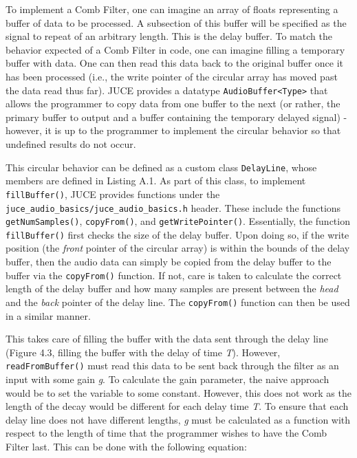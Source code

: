 To implement a Comb Filter, one can imagine an array of floats representing a buffer of data to be processed. A subsection of this buffer will be specified as the signal to repeat of an arbitrary length. This is the delay buffer. To match the behavior expected of a Comb Filter in code, one can imagine filling a temporary buffer with data. One can then read this data back to the original buffer once it has been processed (i.e., the write pointer of the circular array has moved past the data read thus far). JUCE provides a datatype \verb|AudioBuffer<Type>| that allows the programmer to copy data from one buffer to the next (or rather, the primary buffer to output and a buffer containing the temporary delayed signal) - however, it is up to the programmer to implement the circular behavior so that undefined results do not occur.
\lstset{language =[ANSI]C++}
\lstset{linewidth=.95\textwidth,breaklines=true}
\lstset{commentstyle=\textit,stringstyle=\upshape,showspaces=false}
\lstset{frame = single}
\lstset{numbers=left,numberstyle=\tiny,basicstyle=\small}
\lstset{commentstyle=\normalfont\itshape,breakautoindent=true}
\lstset{abovecaptionskip=1.2\baselineskip,xleftmargin=30pt}
\lstset{framesep=6pt}
\begin{singlespace}

\end{singlespace} \hfill \break
\hspace*{0.6cm}This circular behavior can be defined as a custom class \verb|DelayLine|, whose members are defined in Listing A.1. As part of this class, to implement \verb|fillBuffer()|, JUCE provides functions under the \verb|juce_audio_basics/juce_audio_basics.h| header. These include the functions \verb|getNumSamples()|, \verb|copyFrom()|, and \verb|getWritePointer()|. Essentially, the function \verb|fillBuffer()| first checks the size of the delay buffer. Upon doing so, if the write position (the \textit{front} pointer of the circular array) is within the bounds of the delay buffer, then the audio data can simply be copied from the delay buffer to the buffer via the \verb|copyFrom()| function. If not, care is taken to calculate the correct length of the delay buffer and how many samples are present between the \textit{head} and the \textit{back} pointer of the delay line. The \verb|copyFrom()| function can then be used in a similar manner.

This takes care of filling the buffer with the data sent through the delay line (Figure 4.3, filling the buffer with the delay of time \textit{T}). However, \verb|readFromBuffer()| must read this data to be sent back through the filter as an input with some gain \textit{g}. To calculate the gain parameter, the naive approach would be to set the variable to some constant. However, this does not work as the length of the decay would be different for each delay time \textit{T}. To ensure that each delay line does not have different lengths, \textit{g} must be calculated as a function with respect to the length of time that the programmer wishes to have the Comb Filter last. This can be done with the following equation:

